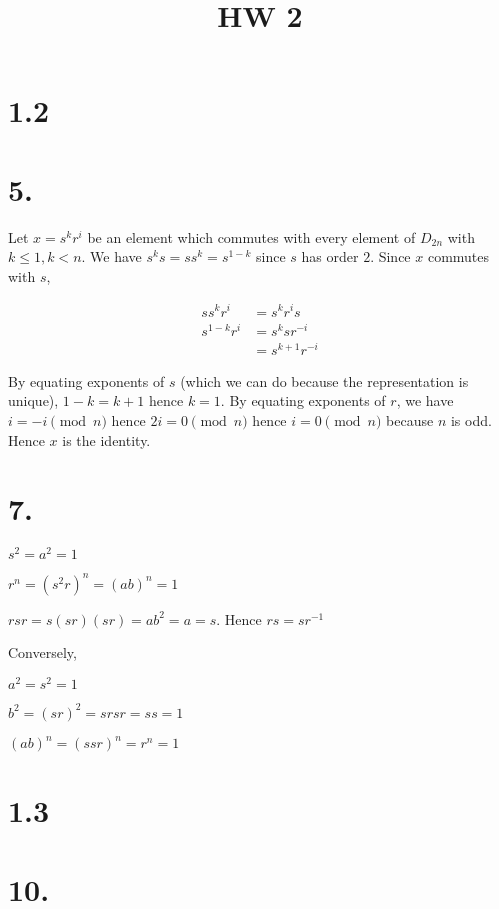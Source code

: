 \documentclass{article}
\title{HW 2}
\date{}
\begin{document}
\maketitle

\section*{1.2}

\section*{5.}

Let $x = s^kr^i$ be an element which commutes with every element of $D_{2n}$ with $k \le 1, k < n$. We have $s^k s = s s^k = s^{1-k}$ since $s$ has order $2$. Since $x$ commutes with $s$,



\begin{align*}
s s^kr^i &= s^kr^i s \\
s^{1-k} r^i &= s^k s r^{-i} \\
&= s^{k+1} r^{-i}
\end{align*}

By equating exponents of $s$ (which we can do because the representation is unique), $1-k = k+1$ hence $k=1$. By equating exponents of $r$, we have $i = -i \pmod n$ hence $2i = 0 \pmod n$ hence $i = 0 \pmod n$ because $n$ is odd. Hence $x$ is the identity.

\section*{7.}

$s^2 = a^2 = 1$

$r^n = (s^2 r)^n = (ab)^n = 1$

$rsr = s(sr)(sr) = ab^2 = a = s$. Hence $rs = sr^{-1}$

Conversely,

$a^2 = s^2 = 1$

$b^2 = (sr)^2 = srsr = ss = 1$

$(ab)^n = (ssr)^n = r^n = 1$

\section*{1.3}

\section*{10.}
\end{document}
